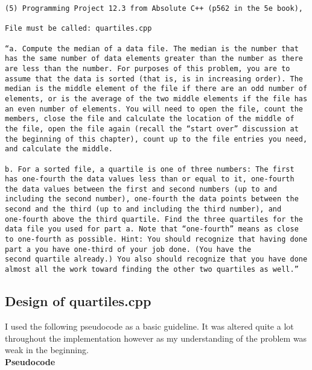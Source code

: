 \documentclass[11pt, oneside]{memoir}
\begin{document}
\begin{verbatim}
(5) Programming Project 12.3 from Absolute C++ (p562 in the 5e book), 

File must be called: quartiles.cpp

“a. Compute the median of a data file. The median is the number that
has the same number of data elements greater than the number as there
are less than the number. For purposes of this problem, you are to
assume that the data is sorted (that is, is in increasing order). The
median is the middle element of the file if there are an odd number of
elements, or is the average of the two middle elements if the file has
an even number of elements. You will need to open the file, count the
members, close the file and calculate the location of the middle of
the file, open the file again (recall the “start over” discussion at
the beginning of this chapter), count up to the file entries you need,
and calculate the middle. 

b. For a sorted file, a quartile is one of three numbers: The first
has one-fourth the data values less than or equal to it, one-fourth
the data values between the first and second numbers (up to and
including the second number), one-fourth the data points between the
second and the third (up to and including the third number), and
one-fourth above the third quartile. Find the three quartiles for the
data file you used for part a. Note that “one-fourth” means as close
to one-fourth as possible. Hint: You should recognize that having done
part a you have one-third of your job done. (You have the 
second quartile already.) You also should recognize that you have done
almost all the work toward finding the other two quartiles as well.”

\end{verbatim}

\subsection{Design of quartiles.cpp}

I used the following pseudocode as a basic guideline.  It was altered
quite a lot throughout the implementation however as my understanding
of the problem was weak in the beginning.\\

\textbf{Pseudocode} \\
\end{document}
